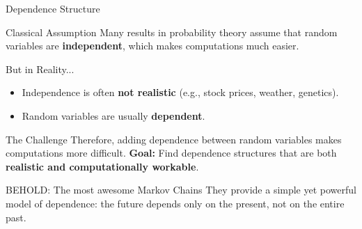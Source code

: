 \documentclass[8pt]{beamer}
\begin{document}
\begin{frame}{Dependence Structure}
\begin{block}{Classical Assumption}
Many results in probability theory assume that random variables are 
\textbf{independent}, which makes computations much easier.
\end{block}

\begin{exampleblock}{But in Reality...}
\begin{itemize}
  \item Independence is often \textbf{not realistic} 
        (e.g., stock prices, weather, genetics).  
  \item Random variables are usually \textbf{dependent}.
\end{itemize}
\end{exampleblock}

\begin{alertblock}{The Challenge}
\vspace{1mm}
Therefore, adding dependence between random variables makes computations more difficult.  
\newline
\newline
\textbf{Goal:} Find dependence structures that are both \textbf{realistic and computationally workable}.
\end{alertblock}

\vspace{2mm}

\begin{block}{BEHOLD: The most awesome Markov Chains}
\vspace{1mm}
They provide a \alert{simple yet powerful model of dependence}: the future depends only on the present, not on the entire past.
\end{block}
\end{frame}
\end{document}
